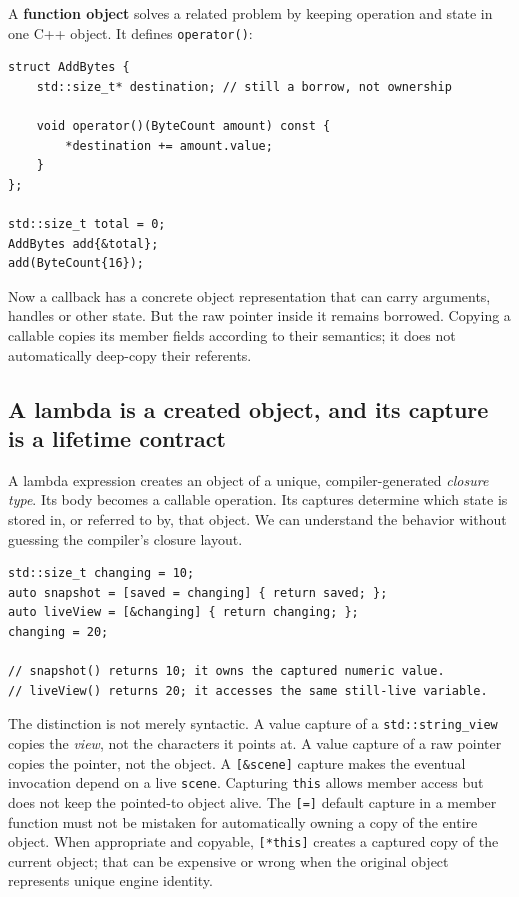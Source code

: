 A \textbf{function object} solves a related problem by keeping operation and state in one C++ object. It defines \texttt{operator()}:

\begin{verbatim}
struct AddBytes {
    std::size_t* destination; // still a borrow, not ownership

    void operator()(ByteCount amount) const {
        *destination += amount.value;
    }
};

std::size_t total = 0;
AddBytes add{&total};
add(ByteCount{16});
\end{verbatim}

Now a callback has a concrete object representation that can carry arguments, handles or other state. But the raw pointer inside it remains borrowed. Copying a callable copies its member fields according to their semantics; it does not automatically deep-copy their referents.

\subsection{A lambda is a created object, and its capture is a lifetime contract}\label{05-engine-i-ch004-a-lambda-is-a-created-object-and-its-capture-is-a-lifetime-contract}

\hypertarget{05-engine-i-ch004-a-lambda-is-a-created-object-and-its-capture-is-a-lifetime-contract}{}

A lambda expression creates an object of a unique, compiler-generated \emph{closure type}. Its body becomes a callable operation. Its captures determine which state is stored in, or referred to by, that object. We can understand the behavior without guessing the compiler's closure layout.

\begin{verbatim}
std::size_t changing = 10;
auto snapshot = [saved = changing] { return saved; };
auto liveView = [&changing] { return changing; };
changing = 20;

// snapshot() returns 10; it owns the captured numeric value.
// liveView() returns 20; it accesses the same still-live variable.
\end{verbatim}

The distinction is not merely syntactic. A value capture of a \texttt{std::string\_view} copies the \emph{view}, not the characters it points at. A value capture of a raw pointer copies the pointer, not the object. A \texttt{{[}\&scene{]}} capture makes the eventual invocation depend on a live \texttt{scene}. Capturing \texttt{this} allows member access but does not keep the pointed-to object alive. The \texttt{{[}={]}} default capture in a member function must not be mistaken for automatically owning a copy of the entire object. When appropriate and copyable, \texttt{{[}*this{]}} creates a captured copy of the current object; that can be expensive or wrong when the original object represents unique engine identity.

